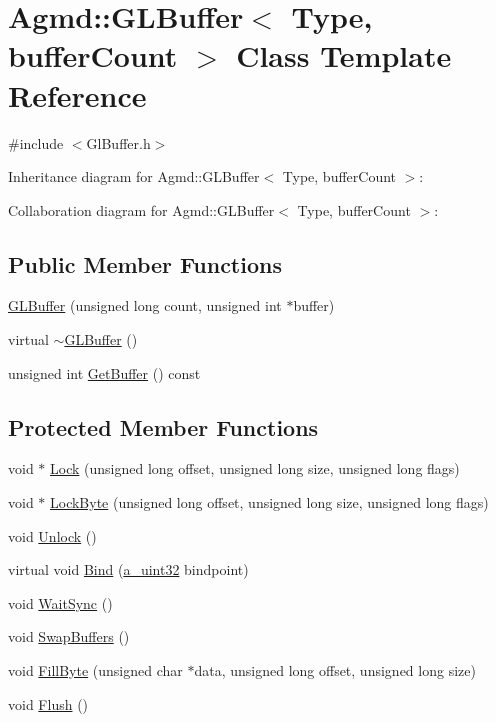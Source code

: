 \hypertarget{class_agmd_1_1_g_l_buffer}{\section{Agmd\+:\+:G\+L\+Buffer$<$ Type, buffer\+Count $>$ Class Template Reference}
\label{class_agmd_1_1_g_l_buffer}
}


{\ttfamily \#include $<$Gl\+Buffer.\+h$>$}



Inheritance diagram for Agmd\+:\+:G\+L\+Buffer$<$ Type, buffer\+Count $>$\+:


Collaboration diagram for Agmd\+:\+:G\+L\+Buffer$<$ Type, buffer\+Count $>$\+:
\subsection*{Public Member Functions}
\begin{DoxyCompactItemize}
\item 
\hyperlink{class_agmd_1_1_g_l_buffer_a063427438dd4eb157750c899c4aec4e4}{G\+L\+Buffer} (unsigned long count, unsigned int $\ast$buffer)
\item 
virtual \hyperlink{class_agmd_1_1_g_l_buffer_ab69eda0d07e2ea04ef8f02b2593e147e}{$\sim$\+G\+L\+Buffer} ()
\item 
unsigned int \hyperlink{class_agmd_1_1_g_l_buffer_a754408f7dcdccd0b8339a3bef54e7cc0}{Get\+Buffer} () const 
\end{DoxyCompactItemize}
\subsection*{Protected Member Functions}
\begin{DoxyCompactItemize}
\item 
void $\ast$ \hyperlink{class_agmd_1_1_g_l_buffer_af528936de0f248d8600f98a4a90b0690}{Lock} (unsigned long offset, unsigned long size, unsigned long flags)
\item 
void $\ast$ \hyperlink{class_agmd_1_1_g_l_buffer_af9af1f6412e317779012ab1e8b8fa392}{Lock\+Byte} (unsigned long offset, unsigned long size, unsigned long flags)
\item 
void \hyperlink{class_agmd_1_1_g_l_buffer_adf95328adee30f22c59f39bc4f04177e}{Unlock} ()
\item 
virtual void \hyperlink{class_agmd_1_1_g_l_buffer_a1e77bdd1dffe7eed3314dada721ef60a}{Bind} (\hyperlink{_common_defines_8h_a964296f9770051b9e4807b1f180dd416}{a\+\_\+uint32} bindpoint)
\item 
void \hyperlink{class_agmd_1_1_g_l_buffer_ab79847088a93b9e0c9ec18acea0dc614}{Wait\+Sync} ()
\item 
void \hyperlink{class_agmd_1_1_g_l_buffer_af88ce97bde11de88a1ca227af3257698}{Swap\+Buffers} ()
\item 
void \hyperlink{class_agmd_1_1_g_l_buffer_afad84215ec431ed1c275b062c76d9ee0}{Fill\+Byte} (unsigned char $\ast$data, unsigned long offset, unsigned long size)
\item 
void \hyperlink{class_agmd_1_1_g_l_buffer_abf3c8799242660a0e05ee7ece5355560}{Flush} ()
\end{DoxyCompactItemize}
